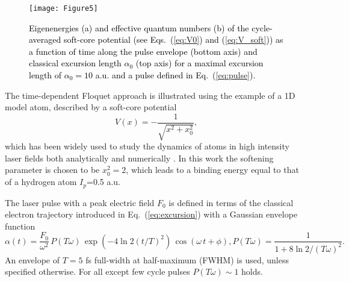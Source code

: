 \documentclass[
pra%
,preprint%
,amssymb, nobibnotes, aps, superscriptaddress, floatfix]{revtex4}
\newcommand{\as}{\alpha}
\newcommand{\CAHt}{$\mathcal{H}(t)$}
\newcommand{\phase}{\phi}
\newcommand{\editt}[1]{\textcolor{black}{#1}}
\begin{document}
\begin{figure*}
	\centering
	\texttt{[image: Figure5]}
	\caption{
	\editt{
	Eigenenergies (a) and effective quantum numbers (b) of the cycle-averaged soft-core potential (see Eqs.~(\ref{eq:V0}) and (\ref{eq:V_soft})) as a function of time along the pulse envelope (bottom axis) and classical excursion length $\as_0$ (top axis) for a maximal excursion length of $\as_0=10$ a.u. and a pulse defined in Eq.~(\ref{eq:pulse}).
	}
	}%
	\label{fig:Ladder}
\end{figure*}



The time-dependent Floquet approach is illustrated using the example of a 1D model atom, described by a soft-core potential
\begin{equation}
V(x) = -\frac{1}{\sqrt{x^2+x_0^2}}, \label{eq:V_soft}
\end{equation}
which has been widely used to study the dynamics of atoms in high intensity laser fields both analytically and numerically \cite{Su1990,Su1991}. In this work the softening parameter is chosen to be $x_0^2=2$, which leads to a binding energy equal to that of a hydrogen atom $I_p$=0.5 a.u. 

The laser pulse with a peak electric field $F_0$ is defined in terms of the classical electron trajectory introduced in Eq.~(\ref{eq:excursion})  with a Gaussian envelope function \cite{Toyota}
\begin{subequations}\label{eq:pulse}
\begin{equation}
\alpha(t) = \frac{F_0}{\omega^2} \, P\left( T\omega \right)  \, \exp\left( -4 \ln2 \left(t/T\right)^2 \right) \, \cos(\omega \, t + \phase),
\end{equation}
\begin{equation}
P\left( T\omega \right) =  \frac{1}{1+8\ln2/(T\omega)^2}.
\end{equation}
\end{subequations}
An envelope of $T=5$ fs full-width at half-maximum (FWHM) is used, unless specified otherwise. For all except few cycle pulses $ P\left( T\omega \right) \sim 1$ holds.
\end{document}
